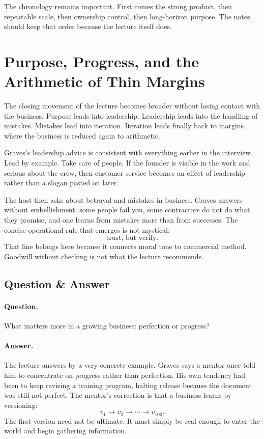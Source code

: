 The chronology remains important. First comes the strong product, then repeatable scale, then ownership control, then long-horizon purpose. The notes should keep that order because the lecture itself does.

\section{Purpose, Progress, and the Arithmetic of Thin Margins}

The closing movement of the lecture becomes broader without losing contact with the business. Purpose leads into leadership. Leadership leads into the handling of mistakes. Mistakes lead into iteration. Iteration leads finally back to margins, where the business is reduced again to arithmetic.

Graves's leadership advice is consistent with everything earlier in the interview. Lead by example. Take care of people. If the founder is visible in the work and serious about the crew, then customer service becomes an effect of leadership rather than a slogan pasted on later.

The host then asks about betrayal and mistakes in business. Graves answers without embellishment: some people fail you, some contractors do not do what they promise, and one learns from mistakes more than from successes. The concise operational rule that emerges is not mystical:
\[
\text{trust, but verify.}
\]
That line belongs here because it connects moral tone to commercial method. Goodwill without checking is not what the lecture recommends.

\subsection{Question \& Answer}

\paragraph{Question.}
What matters more in a growing business: perfection or progress?

\paragraph{Answer.}
The lecture answers by a very concrete example. Graves says a mentor once told him to concentrate on progress rather than perfection. His own tendency had been to keep revising a training program, halting release because the document was still not perfect. The mentor's correction is that a business learns by versioning:
\begin{equation}
v_1 \longrightarrow v_2 \longrightarrow \cdots \longrightarrow v_{100}.
\end{equation}
The first version need not be ultimate. It must simply be real enough to enter the world and begin gathering information.

